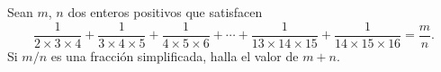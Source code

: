Sean $m$, $n$ dos enteros positivos que satisfacen
\[\frac{1}{2\times3\times4} + \frac{1}{3\times4\times5} + \frac{1}{4\times5\times6} + \cdots + \frac{1}{13\times14\times15} + \frac{1}{14\times15\times16} =\frac mn.\]
Si $m/n$ es una fracción simplificada, halla el valor de $m+n$.